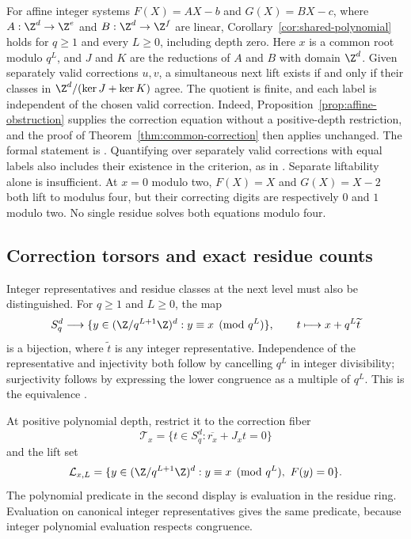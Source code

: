 For affine integer systems $F(X)=AX-b$ and $G(X)=BX-c$, where
$A:\Z^d\to\Z^e$ and $B:\Z^d\to\Z^f$ are linear,
Corollary~\ref{cor:shared-polynomial} holds for $q\ge1$ and every
$L\ge0$, including depth zero. Here $x$ is a common root modulo $q^L$,
and $J$ and $K$ are the reductions of $A$ and $B$ with domain $\Z^d$.
Given separately valid corrections $u,v$, a simultaneous next lift exists
if and only if their classes in $\Z^d/(\ker J+\ker K)$ agree. The quotient
is finite, and each label is independent of the chosen valid correction.
Indeed, Proposition~\ref{prop:affine-obstruction} supplies the correction
equation without a positive-depth restriction, and the proof of
Theorem~\ref{thm:common-correction} then applies unchanged. The formal
statement is .
Quantifying over separately valid corrections with equal labels also
includes their existence in the criterion, as in
.
Separate liftability alone is insufficient. At $x=0$ modulo two,
$F(X)=X$ and $G(X)=X-2$ both lift to modulus four, but their correcting
digits are respectively $0$ and $1$ modulo two. No single residue solves
both equations modulo four.

\subsection{Correction torsors and exact residue counts}

Integer representatives and residue classes at the next level must also be
distinguished. For $q\ge1$ and $L\ge0$, the map
\[
 S_q^d\longrightarrow
 \{y\in(\Z/q^{L+1}\Z)^d:y\equiv x\pmod{q^L}\},
 \qquad t\longmapsto x+q^L\widetilde t
\]
is a bijection, where $\widetilde t$ is any integer representative.
Independence of the representative and injectivity both follow by cancelling
$q^L$ in integer divisibility; surjectivity follows by expressing the lower
congruence as a multiple of $q^L$. This is the equivalence
.

At positive polynomial depth, restrict it to the correction fiber
\[
 \mathcal T_x=\{t\in S_q^d:\overline{r_x}+J_xt=0\}
\]
and the lift set
\[
 \mathcal L_{x,L}=
 \{y\in(\Z/q^{L+1}\Z)^d:y\equiv x\pmod{q^L},\ F(y)=0\}.
\]
The polynomial predicate in the second display is evaluation in the residue
ring. Evaluation on canonical integer representatives gives the same
predicate, because integer polynomial evaluation respects congruence.


